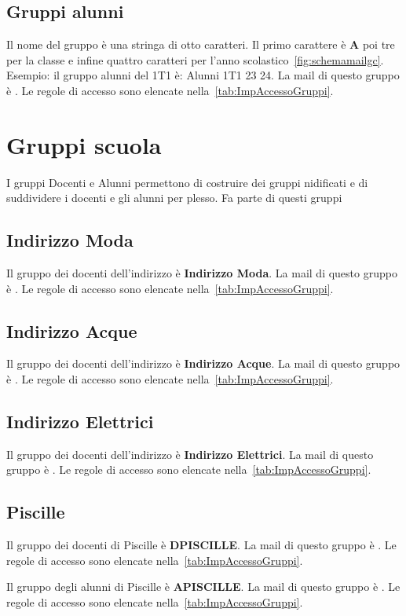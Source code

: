 \subsection{Gruppi alunni}
Il nome del gruppo è una stringa di otto caratteri. Il primo  carattere è \textbf{A} poi  tre  per la classe e infine quattro caratteri per l'anno scolastico~\cref{fig:schemamailgc}.
Esempio: il gruppo alunni del 1T1 è: Alunni 1T1 23 24. La mail di questo gruppo è . Le  regole di accesso  sono elencate nella~\cref{tab:ImpAccessoGruppi}.
\section{Gruppi scuola}
I gruppi Docenti e Alunni permettono di costruire dei gruppi nidificati e di suddividere i docenti e gli alunni per plesso.  Fa parte di questi gruppi 
\subsection{Indirizzo Moda}
Il gruppo dei docenti dell'indirizzo è \textbf{Indirizzo Moda}. La mail di questo gruppo è . Le  regole di accesso  sono elencate nella~\cref{tab:ImpAccessoGruppi}. 
\subsection{Indirizzo Acque}
Il gruppo dei docenti dell'indirizzo è \textbf{Indirizzo Acque}. La mail di questo gruppo è . Le  regole di accesso sono elencate nella~\cref{tab:ImpAccessoGruppi}.
\subsection{Indirizzo Elettrici}
Il gruppo dei docenti dell'indirizzo è \textbf{Indirizzo Elettrici}. La mail di questo gruppo è . Le  regole di accesso sono elencate nella~\cref{tab:ImpAccessoGruppi}.
\subsection{Piscille}
Il gruppo dei docenti di Piscille è \textbf{DPISCILLE}. La mail di questo gruppo è . Le  regole di accesso sono elencate nella~\cref{tab:ImpAccessoGruppi}. 

Il gruppo degli alunni di Piscille è \textbf{APISCILLE}. La mail di questo gruppo è . Le  regole di accesso  sono elencate nella~\cref{tab:ImpAccessoGruppi}. 
